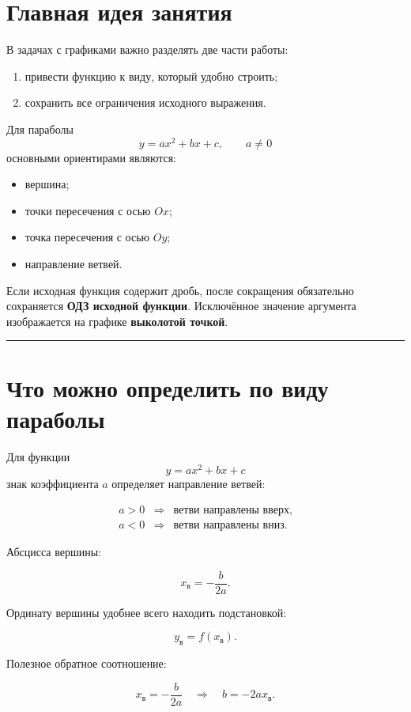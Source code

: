 \documentclass[a4paper,12pt]{article}
\newcommand{\accentline}{%
  \par\noindent
  \textcolor{accent}{\rule{\linewidth}{0.55pt}}
  \par
}
\newcommand{\term}[1]{\textbf{\textcolor{darkaccent}{#1}}}
\begin{document}
\section{Главная идея занятия}

В задачах с графиками важно разделять две части работы:

\begin{enumerate}
  \item привести функцию к виду, который удобно строить;
  \item сохранить все ограничения исходного выражения.
\end{enumerate}

Для параболы
\[
y=ax^2+bx+c,\qquad a\ne0
\]
основными ориентирами являются:

\begin{itemize}
  \item вершина;
  \item точки пересечения с осью \(Ox\);
  \item точка пересечения с осью \(Oy\);
  \item направление ветвей.
\end{itemize}

Если исходная функция содержит дробь, после сокращения обязательно сохраняется
\term{ОДЗ исходной функции}. Исключённое значение аргумента изображается на
графике \term{выколотой точкой}.

\accentline

\section{Что можно определить по виду параболы}

Для функции
\[
y=ax^2+bx+c
\]
знак коэффициента \(a\) определяет направление ветвей:

\[
\begin{array}{ccl}
a>0 &\Longrightarrow& \text{ветви направлены вверх},\\[2mm]
a<0 &\Longrightarrow& \text{ветви направлены вниз}.
\end{array}
\]

Абсцисса вершины:

\[
\boxed{x_{\mathrm{в}}=-\frac{b}{2a}}.
\]

Ординату вершины удобнее всего находить подстановкой:

\[
\boxed{y_{\mathrm{в}}=f(x_{\mathrm{в}})}.
\]

Полезное обратное соотношение:

\[
x_{\mathrm{в}}=-\frac{b}{2a}
\quad\Longrightarrow\quad
\boxed{b=-2ax_{\mathrm{в}}}.
\]
\end{document}
